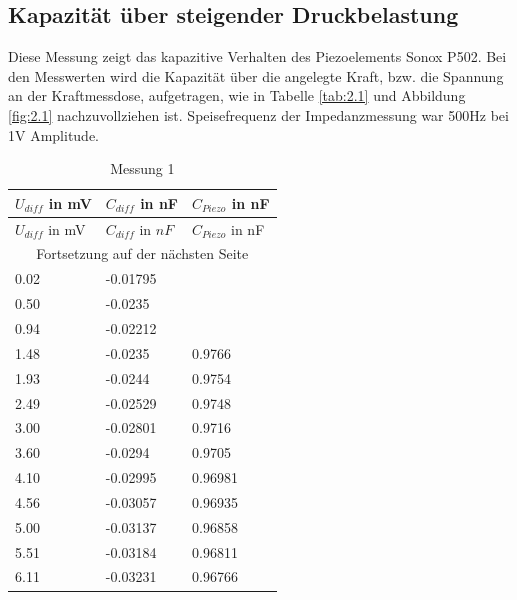 \documentclass[11pt]{scrreprt} %
\begin{document}
\subsection{Kapazität über steigender Druckbelastung}
Diese Messung zeigt das kapazitive Verhalten des Piezoelements Sonox P502. Bei den Messwerten wird die Kapazität über die angelegte Kraft, bzw. die Spannung an der Kraftmessdose, aufgetragen, wie in Tabelle \vref{tab:2.1} und Abbildung \vref{fig:2.1} nachzuvollziehen ist. Speisefrequenz der Impedanzmessung war 500Hz bei 1V Amplitude.
\setlongtables
\begin{longtable}{| l | l | l |}
\caption{Messung 1}\\
\hline
$U_{diff}$ in mV&$C_{diff}$ in nF&$C_{Piezo}$ in nF\\
\hline
\endfirsthead
\hline
$U_{diff}$ in mV&$C_{diff}$ in $nF$&$C_{Piezo}$ in nF\\
\hline
\endhead
\hline
\multicolumn{3}{|c|}{Fortsetzung auf der nächsten Seite}\\
\hline
\endfoot
\hline \hline
\endlastfoot
\hline
\label{tab:2.1}%
0.02&-0.01795&\\
0.50&-0.0235&\\
0.94&-0.02212&\\
1.48&-0.0235&0.9766\\
1.93&-0.0244&0.9754\\
2.49&-0.02529&0.9748\\
3.00&-0.02801&0.9716\\
3.60&-0.0294&0.9705\\
4.10&-0.02995&0.96981\\
4.56&-0.03057&0.96935\\
5.00&-0.03137&0.96858\\
5.51&-0.03184&0.96811\\
6.11&-0.03231&0.96766\\
\end{longtable}
\end{document}
